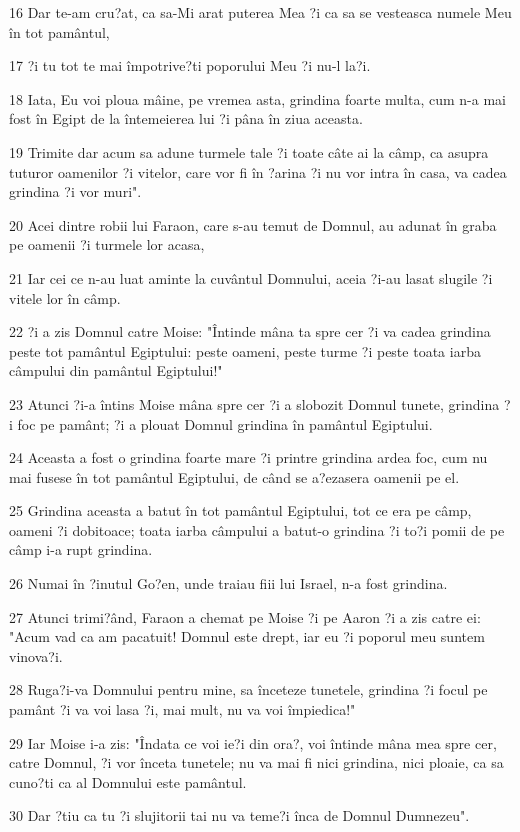 \par 16 Dar te-am cru?at, ca sa-Mi arat puterea Mea ?i ca sa se vesteasca numele Meu în tot pamântul,
\par 17 ?i tu tot te mai împotrive?ti poporului Meu ?i nu-l la?i.
\par 18 Iata, Eu voi ploua mâine, pe vremea asta, grindina foarte multa, cum n-a mai fost în Egipt de la întemeierea lui ?i pâna în ziua aceasta.
\par 19 Trimite dar acum sa adune turmele tale ?i toate câte ai la câmp, ca asupra tuturor oamenilor ?i vitelor, care vor fi în ?arina ?i nu vor intra în casa, va cadea grindina ?i vor muri".
\par 20 Acei dintre robii lui Faraon, care s-au temut de Domnul, au adunat în graba pe oamenii ?i turmele lor acasa,
\par 21 Iar cei ce n-au luat aminte la cuvântul Domnului, aceia ?i-au lasat slugile ?i vitele lor în câmp.
\par 22 ?i a zis Domnul catre Moise: "Întinde mâna ta spre cer ?i va cadea grindina peste tot pamântul Egiptului: peste oameni, peste turme ?i peste toata iarba câmpului din pamântul Egiptului!"
\par 23 Atunci ?i-a întins Moise mâna spre cer ?i a slobozit Domnul tunete, grindina ?i foc pe pamânt; ?i a plouat Domnul grindina în pamântul Egiptului.
\par 24 Aceasta a fost o grindina foarte mare ?i printre grindina ardea foc, cum nu mai fusese în tot pamântul Egiptului, de când se a?ezasera oamenii pe el.
\par 25 Grindina aceasta a batut în tot pamântul Egiptului, tot ce era pe câmp, oameni ?i dobitoace; toata iarba câmpului a batut-o grindina ?i to?i pomii de pe câmp i-a rupt grindina.
\par 26 Numai în ?inutul Go?en, unde traiau fiii lui Israel, n-a fost grindina.
\par 27 Atunci trimi?ând, Faraon a chemat pe Moise ?i pe Aaron ?i a zis catre ei: "Acum vad ca am pacatuit! Domnul este drept, iar eu ?i poporul meu suntem vinova?i.
\par 28 Ruga?i-va Domnului pentru mine, sa înceteze tunetele, grindina ?i focul pe pamânt ?i va voi lasa ?i, mai mult, nu va voi împiedica!"
\par 29 Iar Moise i-a zis: "Îndata ce voi ie?i din ora?, voi întinde mâna mea spre cer, catre Domnul, ?i vor înceta tunetele; nu va mai fi nici grindina, nici ploaie, ca sa cuno?ti ca al Domnului este pamântul.
\par 30 Dar ?tiu ca tu ?i slujitorii tai nu va teme?i înca de Domnul Dumnezeu".
